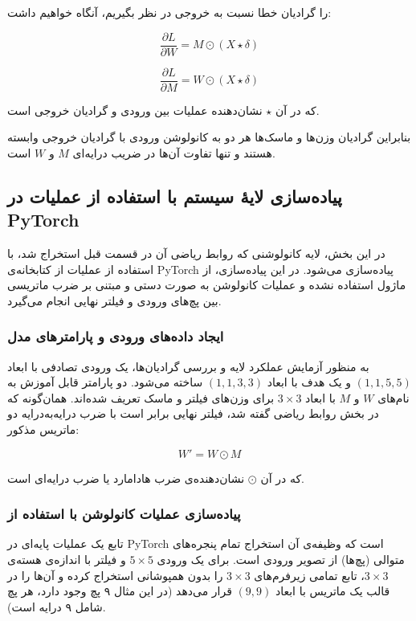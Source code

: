 \documentclass{article}
\begin{document}
را گرادیان خطا نسبت به خروجی در نظر بگیریم، آنگاه خواهیم داشت:

\[
\frac{\partial L}{\partial W}
=
M \odot (X \star \delta)
\]

\[
\frac{\partial L}{\partial M}
=
W \odot (X \star \delta)
\]

که در آن $\star$ نشان‌دهنده عملیات  بین ورودی و گرادیان خروجی است.

بنابراین گرادیان وزن‌ها و ماسک‌ها هر دو به کانولوشن ورودی با گرادیان خروجی وابسته هستند و تنها تفاوت آن‌ها در ضریب درایه‌ای $M$ و $W$ است.
\subsection{پیاده‌سازی لایۀ سیستم با استفاده از عملیات  در PyTorch}

در این بخش، لایه کانولوشنی که روابط ریاضی آن در قسمت قبل استخراج شد، با استفاده از عملیات  از کتابخانه‌ی PyTorch پیاده‌سازی می‌شود. در این پیاده‌سازی، از ماژول  استفاده نشده و عملیات کانولوشن به صورت دستی و مبتنی بر ضرب ماتریسی بین پچ‌های ورودی و فیلتر نهایی انجام می‌گیرد.

\subsubsection{ایجاد داده‌های ورودی و پارامترهای مدل}

به منظور آزمایش عملکرد لایه و بررسی گرادیان‌ها، یک  ورودی تصادفی با ابعاد $(1,1,5,5)$ و یک  هدف با ابعاد $(1,1,3,3)$ ساخته می‌شود. دو پارامتر قابل آموزش به نام‌های $W$ و $M$ با ابعاد $3\times3$ برای وزن‌های فیلتر و ماسک تعریف شده‌اند. همان‌گونه که در بخش روابط ریاضی گفته شد، فیلتر نهایی برابر است با ضرب درایه‌به‌درایه دو ماتریس مذکور:

\[
W' = W \odot M
\]

که در آن $\odot$ نشان‌دهنده‌ی ضرب هادامارد یا ضرب درایه‌ای است.

\subsubsection{پیاده‌سازی عملیات کانولوشن با استفاده از }

تابع  یک عملیات پایه‌ای در PyTorch است که وظیفه‌ی آن استخراج تمام پنجره‌های متوالی (پچ‌ها) از تصویر ورودی است.  
برای یک ورودی $5\times5$ و فیلتر با اندازه‌ی هسته‌ی $3\times3$، تابع  تمامی زیرفرم‌های $3\times3$ را بدون همپوشانی استخراج کرده و آن‌ها را در قالب یک ماتریس با ابعاد $(9,9)$ قرار می‌دهد (در این مثال ۹ پچ وجود دارد، هر پچ شامل ۹ درایه است).
\end{document}
